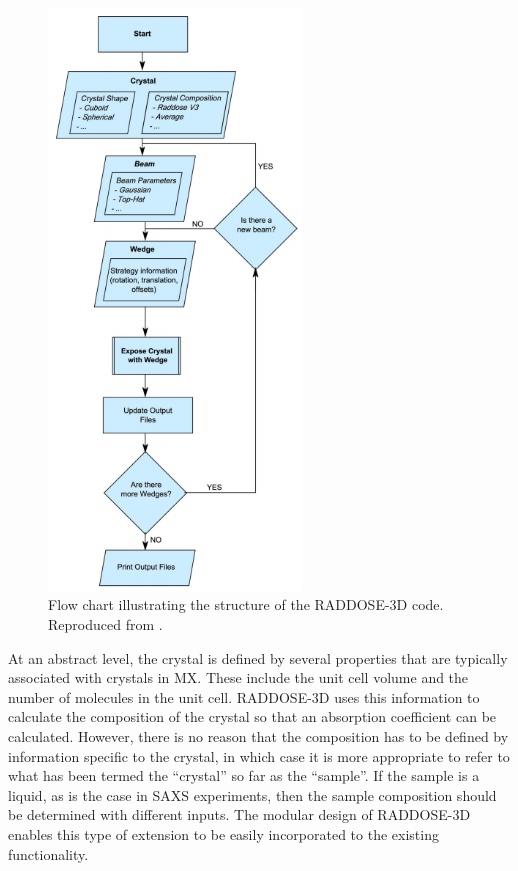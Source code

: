 \begin{figure}
    \centering
    \includegraphics[width=0.6\textwidth]{figures/saxs/raddose_flow.png}
    \caption[Flow diagram illustrating the structure of the RADDOSE-3D code.]{Flow chart illustrating the structure of the RADDOSE-3D code.
    Reproduced from \cite{zeldin2013}.}
    \label{fig:RADDOSE-3D Flow diagram}
\end{figure}

At an abstract level, the crystal is defined by several properties that are typically associated with crystals in MX.
These include the unit cell volume and the number of molecules in the unit cell.
RADDOSE-3D uses this information to calculate the composition of the crystal so that an absorption coefficient can be calculated.
However, there is no reason that the composition has to be defined by information specific to the crystal, in which case it is more appropriate to refer to what has been termed the ``crystal'' so far as the ``sample''.
If the sample is a liquid, as is the case in SAXS experiments, then the sample composition should be determined with different inputs.
The modular design of RADDOSE-3D enables this type of extension to be easily incorporated to the existing functionality.

